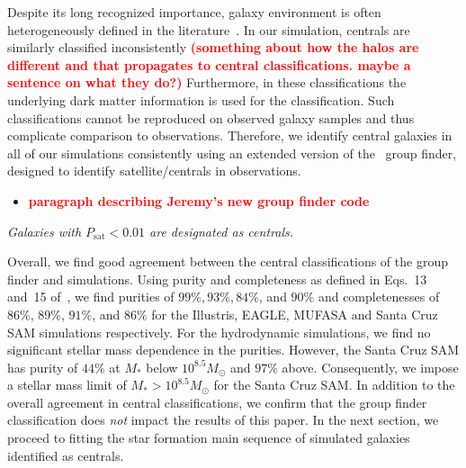\documentclass[preprint2,tighten]{aastex62}
\newcommand{\todo}[1]{{\bf \textcolor{red}{ #1}}}
\begin{document}
Despite its long recognized importance, galaxy environment is often 
heterogeneously defined in the literature~\citep[see][]{campbell2015}. 
In our simulation, centrals are similarly classified 
inconsistently \todo{(something about how the halos are different and 
that propagates to central classifications. maybe a sentence on what they do?)} 
Furthermore, in these classifications the underlying dark matter 
information is used for the classification. Such classifications 
cannot be reproduced on observed galaxy samples and thus complicate 
comparison to observations. Therefore, we identify central galaxies in all of our simulations 
consistently using an extended version of the~\cite{tinker2011} group 
finder, designed to identify satellite/centrals in observations. 

\begin{itemize}
    \item \todo{paragraph describing Jeremy's new group finder code} 
\end{itemize}
\emph{Galaxies with $P_\mathrm{sat} < 0.01$ are designated as centrals.} 

Overall, we find good agreement between the central classifications of 
the group finder and simulations. Using purity and completeness as defined 
in Eqs.~13 and~15 of~\cite{campbell2015}, we find purities of 
$99\%, 93\%, 84\%$, and $90\%$ and completenesses of $86\%$, $89\%$, 
$91\%$, and $86\%$  for the Illustris, EAGLE, MUFASA and Santa Cruz SAM 
simulations respectively. For the hydrodynamic simulations, we find no 
significant stellar mass dependence in the purities. However, the Santa 
Cruz SAM has purity of $44\%$ at $M_*$ below $10^{8.5}M_\odot$ and $97\%$ 
above. Consequently, we impose a stellar mass limit of $M_* > 10^{8.5} M_\odot$
for the Santa Cruz SAM. In addition to the overall agreement in central 
classifications, we confirm that the group finder classification does \emph{not} 
impact the results of this paper. In the next section, we proceed to fitting 
the star formation main sequence of simulated galaxies identified as centrals.

\end{document}
